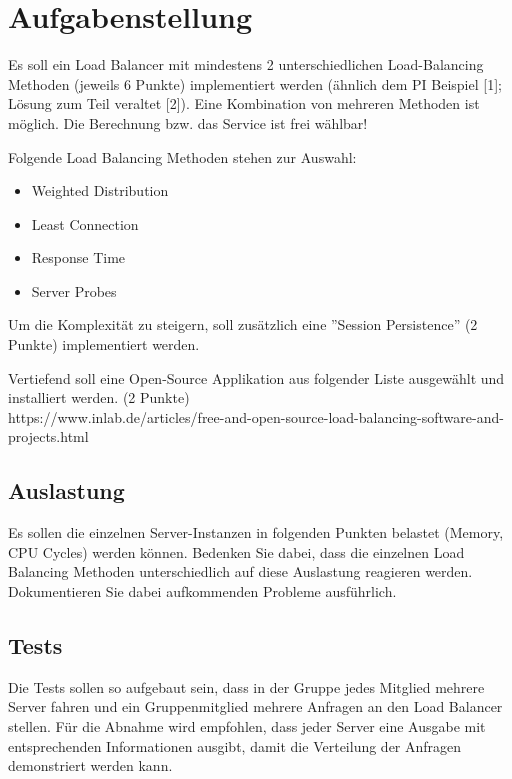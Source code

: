 
\section{Aufgabenstellung}

Es soll ein Load Balancer mit mindestens 2 unterschiedlichen Load-Balancing Methoden (jeweils 6 Punkte) implementiert werden (ähnlich dem PI Beispiel [1]; Lösung zum Teil veraltet [2]). Eine Kombination von mehreren Methoden ist möglich. Die Berechnung bzw. das Service ist frei wählbar!

Folgende Load Balancing Methoden stehen zur Auswahl:
\begin{itemize}
	\item Weighted Distribution
	\item Least Connection
	\item Response Time
	\item Server Probes
\end{itemize}

Um die Komplexität zu steigern, soll zusätzlich eine ''Session Persistence'' (2 Punkte) implementiert werden.

Vertiefend soll eine Open-Source Applikation aus folgender Liste ausgewählt und installiert werden. (2 Punkte)\\
https://www.inlab.de/articles/free-and-open-source-load-balancing-software-and-projects.html

\subsection{Auslastung}

Es sollen die einzelnen Server-Instanzen in folgenden Punkten belastet (Memory, CPU Cycles) werden können.
Bedenken Sie dabei, dass die einzelnen Load Balancing Methoden unterschiedlich auf diese Auslastung reagieren werden. Dokumentieren Sie dabei aufkommenden Probleme ausführlich.

\subsection{Tests}

Die Tests sollen so aufgebaut sein, dass in der Gruppe jedes Mitglied mehrere Server fahren und ein Gruppenmitglied mehrere Anfragen an den Load Balancer stellen. Für die Abnahme wird empfohlen, dass jeder Server eine Ausgabe mit entsprechenden Informationen ausgibt, damit die Verteilung der Anfragen demonstriert werden kann.

